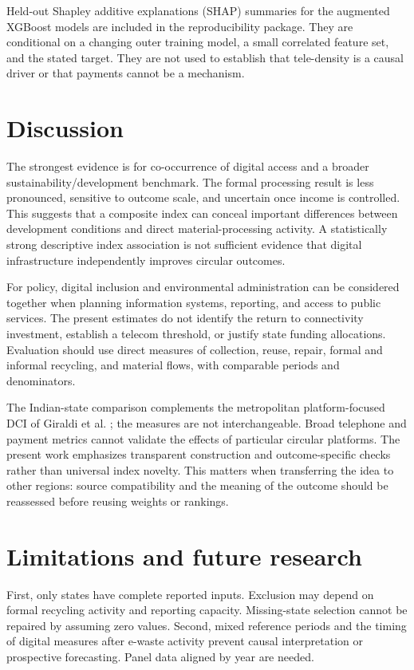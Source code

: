 \documentclass[11pt,a4paper]{article}
\begin{document}


Held-out Shapley additive explanations (SHAP) summaries for the augmented XGBoost models are included in the reproducibility package. They are conditional on a changing outer training model, a small correlated feature set, and the stated target. They are not used to establish that tele-density is a causal driver or that payments cannot be a mechanism.

\section{Discussion}
The strongest evidence is for co-occurrence of digital access and a broader sustainability/development benchmark. The formal processing result is less pronounced, sensitive to outcome scale, and uncertain once income is controlled. This suggests that a composite index can conceal important differences between development conditions and direct material-processing activity. A statistically strong descriptive index association is not sufficient evidence that digital infrastructure independently improves circular outcomes.

For policy, digital inclusion and environmental administration can be considered together when planning information systems, reporting, and access to public services. The present estimates do not identify the return to connectivity investment, establish a telecom threshold, or justify state funding allocations. Evaluation should use direct measures of collection, reuse, repair, formal and informal recycling, and material flows, with comparable periods and denominators.

The Indian-state comparison complements the metropolitan platform-focused DCI of Giraldi et al. \cite{giraldi}; the measures are not interchangeable. Broad telephone and payment metrics cannot validate the effects of particular circular platforms. The present work emphasizes transparent construction and outcome-specific checks rather than universal index novelty. This matters when transferring the idea to other regions: source compatibility and the meaning of the outcome should be reassessed before reusing weights or rankings.

\section{Limitations and future research}
First, only \SampleN{} states have complete reported inputs. Exclusion may depend on formal recycling activity and reporting capacity. Missing-state selection cannot be repaired by assuming zero values. Second, mixed reference periods and the timing of digital measures after e-waste activity prevent causal interpretation or prospective forecasting. Panel data aligned by year are needed.
\end{document}
